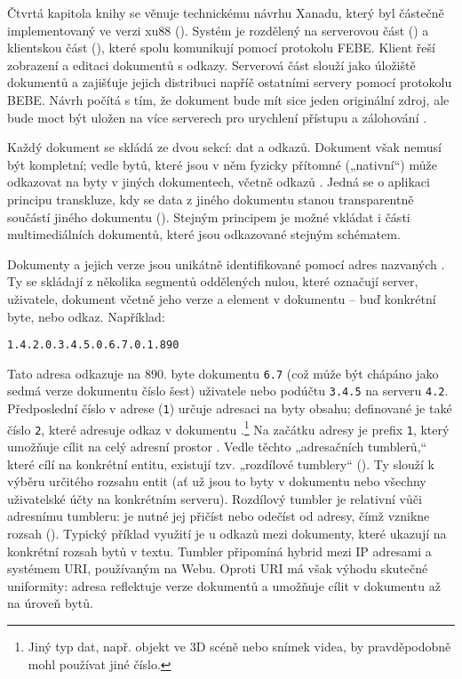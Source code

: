 \label{p:litmachines:4}
Čtvrtá kapitola knihy se věnuje technickému návrhu Xanadu, který byl částečně implementovaný ve verzi xu88 (). Systém je rozdělený na serverovou část () a klientskou část (), které spolu komunikují pomocí protokolu FEBE. Klient řeší zobrazení a editaci dokumentů s odkazy. Serverová část slouží jako úložiště dokumentů a zajišťuje jejich distribuci napříč ostatními servery pomocí protokolu BEBE. Návrh počítá s tím, že dokument bude mít sice jeden originální zdroj, ale bude moct být uložen na více serverech pro urychlení přístupu a zálohování \autocite[4/71]{LitMachines}.

\label{p:litmachines:docs}
Každý dokument se skládá ze dvou sekcí: dat a odkazů. Dokument však nemusí být kompletní; vedle bytů, které jsou v něm fyzicky přítomné („nativní“) může odkazovat na byty v jiných dokumentech, včetně odkazů \autocite[4/6--4/11]{LitMachines}. Jedná se o aplikaci principu transkluze, kdy se data z jiného dokumentu stanou transparentně součástí jiného dokumentu (). Stejným principem je možné vkládat i části multimediálních dokumentů, které jsou odkazované stejným schématem.

\label{p:litmachines:tumbler}
Dokumenty a jejich verze jsou unikátně identifikované pomocí adres nazvaných . Ty se skládají z několika segmentů oddělených nulou, které označují server, uživatele, dokument včetně jeho verze a element v dokumentu -- buď konkrétní byte, nebo odkaz. Například:

\begin{verbatim}
1.4.2.0.3.4.5.0.6.7.0.1.890
\end{verbatim}

Tato adresa odkazuje na 890. byte dokumentu \texttt{6.7} (což může být chápáno jako sedmá verze dokumentu číslo šest) uživatele nebo podúčtu \texttt{3.4.5} na serveru \texttt{4.2}. Předposlední číslo v adrese (\texttt{1}) určuje adresaci na byty obsahu; definované je také číslo \texttt{2}, které adresuje odkaz v dokumentu \autocite[4/29--4/30]{LitMachines}.\footnote{Jiný typ dat, např. objekt ve 3D scéně nebo snímek videa, by pravděpodobně mohl používat jiné číslo.}
Na začátku adresy je prefix \texttt{1}, který umožňuje cílit na celý adresní prostor \autocite[4/22]{LitMachines}. Vedle těchto „adresačních tumblerů,“ které cílí na konkrétní entitu, existují tzv. „rozdílové tumblery“ (). Ty slouží k výběru určitého rozsahu entit (ať už jsou to byty v dokumentu nebo všechny uživatelské účty na konkrétním serveru). Rozdílový tumbler je relativní vůči adresnímu tumbleru: je nutné jej přičíst nebo odečíst od adresy, čímž vznikne rozsah (). Typický příklad využití je u odkazů mezi dokumenty, které ukazují na konkrétní rozsah bytů v textu. Tumbler připomíná hybrid mezi IP adresami a systémem URI, používaným na Webu. Oproti URI má však výhodu skutečné uniformity: adresa reflektuje verze dokumentů a umožňuje cílit v dokumentu až na úroveň bytů.

